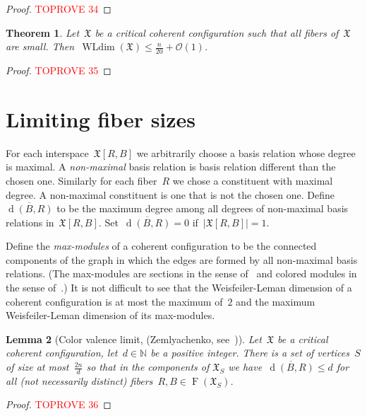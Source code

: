 \documentclass[english,a4paper]{article}
\theoremstyle{plain}
\newtheorem{theorem}             {Theorem}[section]
\newtheorem{lemma}      [theorem]{Lemma}
\theoremstyle{definition}
\newcommand{\Nat}{\ensuremath{\mathbb{N}}}
\DeclareMathOperator{\Fibers}{F}
\newcommand{\coherentConfig}{\ensuremath{\mathfrak{X}}}
\newcommand{\fibers}[1]{\ensuremath{\Fibers \left( #1 \right)}}
\newcommand{\interspace}[2]{\ensuremath{\coherentConfig[#1,#2]}}
\newcommand{\minimalDegree}[2]{\Deg(#1,#2)}
\DeclareMathOperator*{\WLdim}{WLdim}
\newcommand{\wldim}[1]{\ensuremath{\WLdim\left(#1\right)}}
\DeclareMathOperator{\Deg}{d}
\begin{document}
\begin{proof}\textcolor{red}{TOPROVE 34}\end{proof}


\begin{theorem}
\label{small-cc:wldim/thm}
    Let~$\coherentConfig$ be a critical coherent configuration such that all fibers of~$\coherentConfig$ are small.
    Then~$\wldim{\coherentConfig} \leq \frac{n}{20} + \mathcal{O}(1)$.
\end{theorem}
\begin{proof}\textcolor{red}{TOPROVE 35}\end{proof}

     


\section{Limiting fiber sizes}
\label{sec:limit:fiber:sizes}


For each interspace~$\interspace{R}{B}$ we arbitrarily choose a basis relation whose degree is maximal. A \emph{non-maximal} basis relation is basis relation different than the chosen one.
Similarly for each fiber~$R$ we chose a constituent with maximal degree. A non-maximal constituent is one that is not the chosen one. Define~$\overline{\minimalDegree{B}{R}}$ to be the maximum degree among all degrees of non-maximal basis relations in~$\interspace{R}{B}$. Set~$\overline{\minimalDegree{B}{R}}=0$ if~$|\interspace{R}{B}|=1$.

Define the \emph{max-modules} of a coherent configuration to be the connected components of the graph in which the edges are formed by all non-maximal basis relations. (The max-modules are sections in the sense of~\cite{DBLP:journals/dam/Goldberg83} and colored modules in the sense of~\cite{DBLP:journals/mst/Schweitzer17}.)
It is not difficult to see that the Weisfeiler-Leman dimension of a coherent configuration is at most the maximum of~$2$ and the maximum Weisfeiler-Leman dimension of its max-modules.


\begin{lemma}[Color valence limit, (Zemlyachenko, see~\cite{DBLP:conf/fct/Babai81})]
\label{lem:bound-on-min:degree}
    Let~$\coherentConfig$ be a critical coherent configuration, let~$d \in \Nat$ be a positive integer.
    There is a set of vertices~$S$ of size at most~$\frac{2n}{d}$  so that in the components of
    $\coherentConfig_S$ we have~$\overline{\minimalDegree{B}{R}}\leq d$
     for all (not necessarily distinct) fibers~$R,B \in \fibers{\coherentConfig_S}$.
\end{lemma}
\begin{proof}\textcolor{red}{TOPROVE 36}\end{proof}
\end{document}
